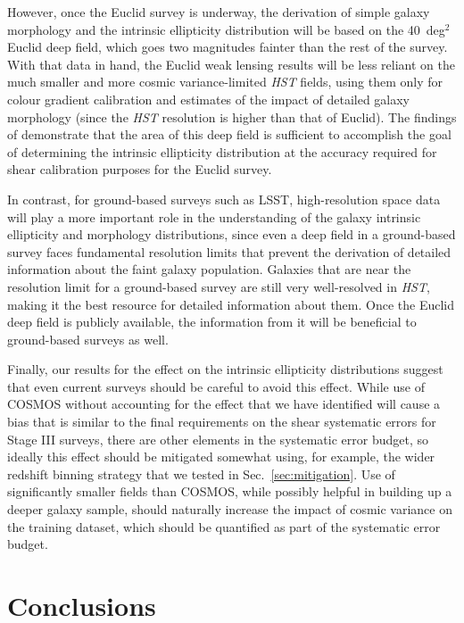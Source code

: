 \documentclass[twocolumn,useAMS,usenatbib]{mn2e}
\begin{document}
However, once the Euclid survey is
  underway, the derivation of simple galaxy morphology and the
  intrinsic ellipticity distribution will be based on the 40~deg$^2$
  Euclid deep field, which goes two magnitudes fainter than the rest of
  the survey.  With that data in hand, the Euclid weak lensing
  results will be less reliant on the much smaller and more
  cosmic variance-limited {\em HST} fields, using them only for colour
  gradient calibration and estimates of the impact of detailed galaxy
  morphology (since the {\em HST} resolution is higher than that
  of Euclid). The findings of \cite{2014MNRAS.439.1909V} demonstrate that the area of
  this deep field is sufficient to accomplish the goal of determining
  the intrinsic ellipticity distribution at the accuracy required for
  shear calibration purposes for the Euclid survey.

In contrast, for ground-based surveys such
  as LSST, high-resolution space data will play a more important role
  in the understanding of the galaxy 
  intrinsic ellipticity and morphology distributions, since even a deep
  field in a ground-based survey faces fundamental resolution limits
  that prevent the derivation of detailed information about the faint
  galaxy population.  Galaxies that are near the resolution limit for
  a ground-based survey are still very well-resolved in {\em HST},
  making it the best resource for detailed information about them.
  Once the Euclid deep field is publicly available, the information
  from it will be beneficial to ground-based surveys as well.

Finally, our results for the effect on the intrinsic
  ellipticity distributions suggest that even current surveys should
  be careful to avoid this effect.  While use of COSMOS without
  accounting for the effect that we have identified will cause a bias
  that is similar to the final requirements on the shear systematic
  errors for Stage III surveys, there are other elements in the
  systematic error budget, so ideally this effect should be mitigated
  somewhat using, for example, the wider redshift binning strategy
  that we tested in Sec.~\ref{sec:mitigation}.  Use of significantly smaller fields
  than COSMOS, while possibly helpful in building up a deeper galaxy
  sample, should naturally increase the impact of cosmic
  variance on the training dataset, which should be quantified as part
  of the systematic error budget.

\section{Conclusions}
\label{S:summary}
\end{document}
